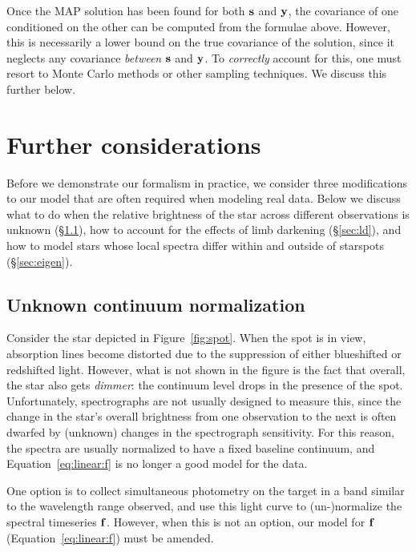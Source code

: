 \documentclass[modern]{aastex62}
\begin{document}
Once the MAP solution has been found for both ${\mathbf{s}}$ and ${\mathbf{y}}$,
the covariance of one conditioned on the other can be computed from the
formulae above. However, this is necessarily a lower bound on the true
covariance of the solution, since it neglects any covariance \emph{between}
${\mathbf{s}}$ and ${\mathbf{y}}$. To \emph{correctly} account for this, one must
resort to Monte Carlo methods or other sampling techniques. We discuss
this further below.


\section{Further considerations}
\label{sec:bellswhistles}

Before we demonstrate our formalism in practice, we consider three
modifications to our model that are often required when modeling real
data. Below we discuss what to do when the relative brightness of the
star across different observations is unknown (\S\ref{sec:norm}), how
to account for the effects of limb darkening (\S\ref{sec:ld}), and how
to model stars whose local spectra differ within and outside of starspots
(\S\ref{sec:eigen}).

\subsection{Unknown continuum normalization}
\label{sec:norm}
%
Consider the star depicted in Figure~\ref{fig:spot}. When the spot is in
view, absorption lines become distorted due to the suppression of either
blueshifted or redshifted light. However, what is not shown in the figure
is the fact that overall, the star also gets \emph{dimmer}: the 
continuum level drops in the presence of the spot. Unfortunately, 
spectrographs are not usually designed to measure this, since the
change in the star's overall brightness from one observation to the next
is often dwarfed by (unknown) changes in the spectrograph sensitivity. 
For this reason, the spectra are usually normalized to have a
fixed baseline continuum, and Equation~\ref{eq:linear:f} is no longer
a good model for the data.

One option is to collect simultaneous photometry on the target in a band
similar to the wavelength range observed, and use this light curve to
(un-)normalize the spectral timeseries ${\mathbf{f}}$. However, when this is
not an option, our model for ${\mathbf{f}}$ (Equation~\ref{eq:linear:f}) must
be amended.
\end{document}
